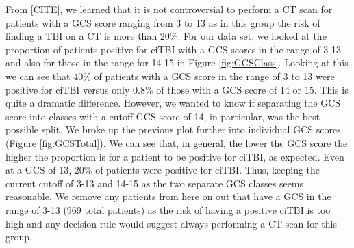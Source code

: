 \documentclass[11pt]{amsart}
\begin{document}
From [CITE], we learned that it is not controversial to perform a CT scan for patients with a GCS score ranging from 3 to 13 as in this group the risk of finding a TBI on a CT is more than 20\%. For our data set, we looked at the proportion of patients positive for ciTBI with a GCS scores in the range of 3-13 and also for those in the range for 14-15 in Figure \ref{fig:GCSClass}. Looking at this we can see that 40\% of patients with a GCS score in the range of 3 to 13 were positive for ciTBI versus only 0.8\% of those with a GCS score of 14 or 15. This is quite a dramatic difference. However, we wanted to know if separating the GCS score into classes with a cutoff GCS score of 14, in particular, was the best possible split. We broke up the previous plot further into individual GCS scores (Figure \ref{fig:GCSTotal}). We can see that, in general, the lower the GCS score the higher the proportion is for a patient to be positive for ciTBI, as expected. Even at a GCS of 13, 20\% of patients were positive for ciTBI. Thus, keeping the current cutoff of 3-13 and 14-15 as the two separate GCS classes seems reasonable. We remove any patients from here on out that have a GCS in the range of 3-13 (969 total patients) as the risk of having a positive ciTBI is too high and any decision rule would suggest always performing a CT scan for this group.
\FloatBarrier
\end{document}
